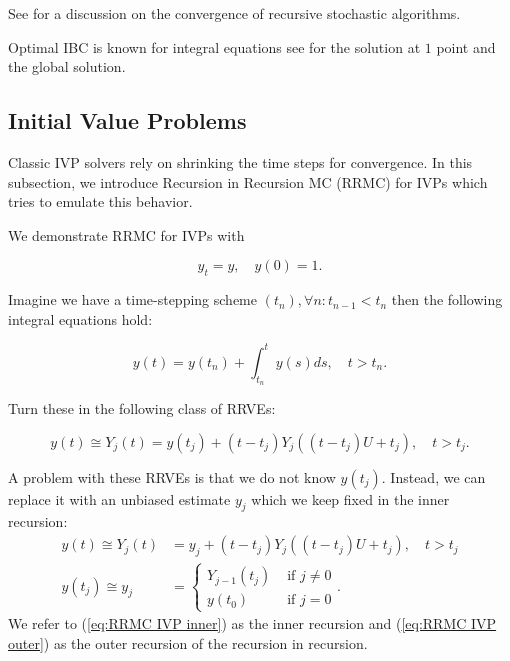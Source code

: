 \documentclass[a4paper,12pt]{article}
\begin{document}
\begin{related}
    See \cite{gupta_convergence_2021} for a discussion on the convergence
    of recursive stochastic algorithms.
\end{related}


\begin{related}
    Optimal IBC is known for integral equations see \cite{heinrich_monte_nodate}
    for the solution at $1$ point and the global solution.
\end{related}

\subsection{Initial Value Problems}
Classic IVP solvers rely on shrinking the time steps for
convergence. In this subsection, we introduce
Recursion in Recursion MC (RRMC) for IVPs which tries to emulate
this behavior.


\begin{example}[RRMC $y_t=y$] \label{ex:RRMC IVP}
    We demonstrate RRMC for IVPs with

    \begin{equation}
        y_t = y, \quad y(0) = 1.
    \end{equation}

    Imagine we have a time-stepping scheme $(t_{n}), \forall n: t_{n-1} < t_{n}$
    then the following integral equations hold:

    \begin{equation}
        y(t)= y(t_{n}) + \int_{t_{n}}^{t}y(s)ds , \quad t>t_{n}.
    \end{equation}

    Turn these in the following class of RRVEs:

    \begin{equation}
        y(t) \cong Y_{j}(t) = y(t_{j}) + (t-t_{j})Y_{j}((t-t_{j})U+t_{j}), \quad t>t_{j}.
    \end{equation}

    A problem with these RRVEs is that we do not know $y(t_{j})$.
    Instead, we can replace it with an unbiased estimate $y_{j}$
    which we keep fixed in the inner recursion:
    \begin{align}
        \label{eq:RRMC IVP inner}
        y(t) \cong Y_{j}(t)  & = y_{j} + (t-t_{j})Y_{j}((t-t_{j})U+t_{j}), \quad t>t_{j} \\
        y(t_{j}) \cong y_{j} & = \begin{cases}
                                     Y_{j-1}(t_{j}) & \text{ if } j \neq 0 \\
                                     y(t_{0})       & \text{ if } j = 0
                                 \end{cases}.
        \label{eq:RRMC IVP outer}
    \end{align}
    We refer to (\ref{eq:RRMC IVP inner}) as the inner recursion and
    (\ref{eq:RRMC IVP outer}) as the outer recursion of the recursion in
    recursion.
\end{example}
\end{document}
